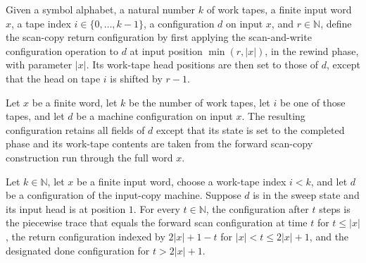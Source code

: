 \begin{definition}
\label{Turing.scanCopyR}
\leanok
{}
Given a symbol alphabet, a natural number $k$ of work tapes, a finite input word $x$, a
tape index $i\in\{0,\ldots,k-1\}$, a configuration $d$ on input $x$, and
$r\in\mathbb{N}$, define the scan-copy return configuration by first applying the
scan-and-write configuration operation to $d$ at input position $\min(r,|x|)$, in the
rewind phase, with parameter $|x|$. Its work-tape head positions are then set to those
of $d$, except that the head on tape $i$ is shifted by $r-1$.
\end{definition}

\begin{definition}
\label{Turing.scanCopyD}
\leanok
{}
Let $x$ be a finite word, let $k$ be the number of work tapes, let $i$ be one of those
tapes, and let $d$ be a machine configuration on input $x$. The resulting configuration
retains all fields of $d$ except that its state is set to the completed phase and its
work-tape contents are taken from the forward scan-copy construction run through the
full word $x$.
\end{definition}

\begin{theorem}
\label{Turing.scan_copy_trace}
\leanok
{}
Let $k\in\mathbb N$, let $x$ be a finite input word, choose a work-tape index $i<k$, and
let $d$ be a configuration of the input-copy machine. Suppose $d$ is in the sweep state
and its input head is at position $1$. For every $t\in\mathbb N$, the configuration
after $t$ steps is the piecewise trace that equals the forward scan configuration at
time $t$ for $t\le |x|$, the return configuration indexed by $2|x|+1-t$ for $|x|<t\le
2|x|+1$, and the designated done configuration for $t>2|x|+1$.
\end{theorem}

